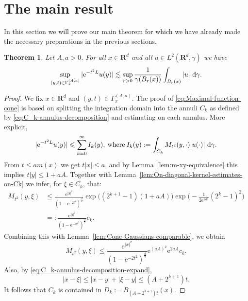 \documentclass{amsart}
\newtheorem{theorem}{Theorem}
\theoremstyle{remark}
\newcommand{\D}{\,\textup{d}}
\newcommand{\LHG}{{L^2(\R^d,\gamma)}}
\renewcommand{\leq}{\leqslant}
\newcommand{\R}{\mathbf R}
\newcommand{\e}{\mathrm{e}} %
\begin{document}
\section{The main result}
In this section we will prove our main theorem for which we have already made
the necessary preparations in the previous sections.
\begin{theorem}\label{thm:Gaussian-maximal-function}
  Let $A, a > 0$. For all $x\in \R^d$ and all $u \in \LHG$ we have
  \begin{equation}
    \label{eq:Maximal-function-cone}
    \sup_{(y, t) \in \Gamma_x^{(A, a)}} |\e^{-t^2 L} u(y)| \lesssim
    \sup_{r > 0} \frac1{\gamma(B_r(x))}\int_{B_r(x)} |u| \, \D\gamma.
  \end{equation}
\end{theorem}
\begin{proof}
  We fix $x \in \R^d$ and $ (y, t) \in \Gamma_x^{(A, a)}$. The proof of
  \eqref{eq:Maximal-function-cone} is based on splitting the
  integration domain into the annuli $C_k$ as defined by
  \eqref{eq:C_k-annulus-decomposition} and estimating on each annulus. More
  explicit,
  \begin{equation}
    \label{eq:Maximal-function-cone-intermediate-step-1}
    |\e^{-t^2 L} u(y)| \leq \sum_{k = 0}^\infty I_k(y),
    \:\text{where}\: I_k(y) := \int_{C_k} M_{t^2}(y, \cdot) |u(\cdot)|
    \,\D\gamma.
  \end{equation} 
  From $t \leq a m(x)$ we get $t |x| \leq a$, and by
  Lemma~\ref{lem:m-xy-equivalence} this implies $t |y| \leq 1 + aA$. Together
  with Lemma~\ref{lem:On-diagonal-kernel-estimates-on-Ck} we infer, for $\xi
  \in C_k$, that:
  \begin{align*}
    \label{eq:Mehler-kernel-estimate-one-sided-bound-1}
    M_{t^2}(y, \xi) &\leq \frac{\e^{|y|^2}}{(1 - \e^{-2t^2})^{\frac{d}2}}
    \exp\bigl((2^{k + 1} - 1) (1 + aA) \bigr) \exp\Big(\!-\!\frac1{2 \e^{2a^2}}
    (2^k - 1)^2 \Big)\\
    &=: \frac{\e^{|y|^2}}{(1 - \e^{-2t^2})^{\frac{d}2}} c_k.
  \end{align*}
  Combining this with Lemma~\ref{lem:Cone-Gaussians-comparable}, we obtain
  \begin{equation}
    \label{eq:Mehler-kernel-estimate-one-sided-bound-1}
    M_{t^2}(y, \xi) \leq \frac{\e^{|x|^2}}{(1 - \e^{-2t^2})^{\frac{d}2}}
    \e^{(aA)^2} \e^{2aA} c_k.
  \end{equation}       
  Also, by \eqref{eq:C_k-annulus-decomposition-expand},
  \begin{equation*}
    |x - \xi| \leq |x - y| + |\xi - y| \leq (A + 2^{k + 1})t .
  \end{equation*}
  It follows that $ C_k$ is contained in $D_k := B_{(A +2^{k + 1})t}(x)$.


\end{proof}
\end{document}
